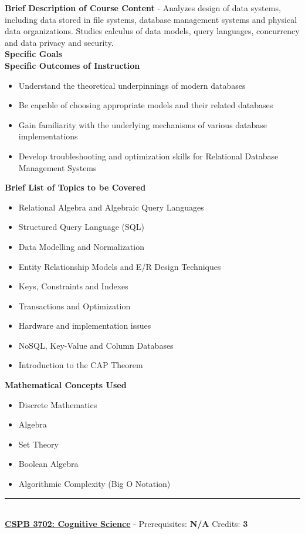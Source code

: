 \documentclass{article}
\newcommand{\horizontalline}{\noindent \rule{\textwidth}{0.5pt} \\}
\begin{document}
\noindent \textbf{Brief Description of Course Content} - Analyzes design of data systems, including data stored in file systems, database management systems and physical data organizations. Studies calculus of data models, query languages, concurrency and data privacy and security. \\

\noindent \textbf{Specific Goals} \\

\noindent \textbf{Specific Outcomes of Instruction}
\begin{itemize}
    \item Understand the theoretical underpinnings of modern databases
    \item Be capable of choosing appropriate models and their related databases
    \item Gain familiarity with the underlying mechanisms of various database implementations
    \item Develop troubleshooting and optimization skills for Relational Database Management Systems
\end{itemize}

\noindent \textbf{Brief List of Topics to be Covered}
\begin{itemize}
    \item Relational Algebra and Algebraic Query Languages
    \item Structured Query Language (SQL)
    \item Data Modelling and Normalization
    \item Entity Relationship Models and E/R Design Techniques
    \item Keys, Constraints and Indexes
    \item Transactions and Optimization
    \item Hardware and implementation issues
    \item NoSQL, Key-Value and Column Databases
    \item Introduction to the CAP Theorem
\end{itemize}

\noindent \textbf{Mathematical Concepts Used}
\begin{itemize}
    \item Discrete Mathematics
    \item Algebra
    \item Set Theory
    \item Boolean Algebra
    \item Algorithmic Complexity (Big O Notation)
\end{itemize}
\horizontalline
\noindent \href{https://www.colorado.edu/program/cspb/cspb-3702-cognitive-science}{\textbf{CSPB 3702: Cognitive Science}} - Prerequisites: \textbf{N/A} Credits: \textbf{3} \\
\end{document}
